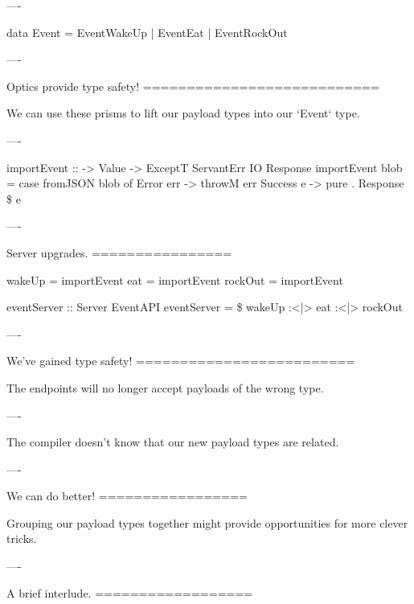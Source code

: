 ----

\begin{raw}

  data Event = EventWakeUp  
             | EventEat     
             | EventRockOut 

\end{raw}

----

Optics provide type safety!
===========================

We can use these prisms to lift our payload types into our `Event` type.

----

\begin{raw}

  importEvent :: 
              -> Value
              -> ExceptT ServantErr IO Response
  importEvent  blob =
    case fromJSON blob of
      Error   err -> throwM err
      Success e   -> pure . Response \$  e
\end{raw}

----

Server upgrades.
================

\begin{raw}
  wakeUp  = importEvent 
  eat     = importEvent 
  rockOut = importEvent 

  eventServer :: Server EventAPI
  eventServer =  \$
    wakeUp :<|> eat :<|> rockOut
\end{raw}

----

We've gained type safety!
=========================

The endpoints will no longer accept payloads of the wrong type.

----

The compiler doesn't know that our new payload types are related.

----

We can do better!
=================

Grouping our payload types together might provide opportunities for more clever tricks.

----

A brief interlude.
==================

